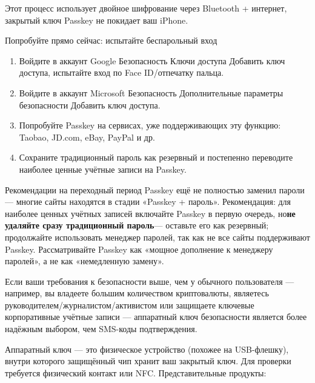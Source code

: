 Этот процесс использует двойное шифрование через Bluetooth + интернет, закрытый ключ Passkey не покидает ваш iPhone.

\begin{tcbpractice}{Попробуйте прямо сейчас: испытайте беспарольный вход}
\begin{enumerate}
  \item Войдите в аккаунт Google Безопасность Ключи доступа Добавить ключ доступа, испытайте вход по Face ID/отпечатку пальца.
  \item Войдите в аккаунт Microsoft Безопасность Дополнительные параметры безопасности Добавить ключ доступа.
  \item Попробуйте Passkey на сервисах, уже поддерживающих эту функцию: Taobao, JD.com, eBay, PayPal и др.
  \item Сохраните традиционный пароль как резервный и постепенно переводите наиболее ценные учётные записи на Passkey.
\end{enumerate}

\end{tcbpractice}

\begin{tcbwarn}{Рекомендации на переходный период}
Passkey ещё не полностью заменил пароли — многие сайты находятся в стадии «Passkey + пароль». Рекомендация: для наиболее ценных учётных записей включайте Passkey в первую очередь, но\textbf{не удаляйте сразу традиционный пароль}— оставьте его как резервный; продолжайте использовать менеджер паролей, так как не все сайты поддерживают Passkey. Рассматривайте Passkey как «мощное дополнение к менеджеру паролей», а не как «немедленную замену».

\end{tcbwarn}


Если ваши требования к безопасности выше, чем у обычного пользователя — например, вы владеете большим количеством криптовалюты, являетесь руководителем/журналистом/активистом или защищаете ключевые корпоративные учётные записи — аппаратный ключ безопасности является более надёжным выбором, чем SMS-коды подтверждения.


Аппаратный ключ — это физическое устройство (похожее на USB-флешку), внутри которого защищённый чип хранит ваш закрытый ключ. Для проверки требуется физический контакт или NFC. Представительные продукты:

